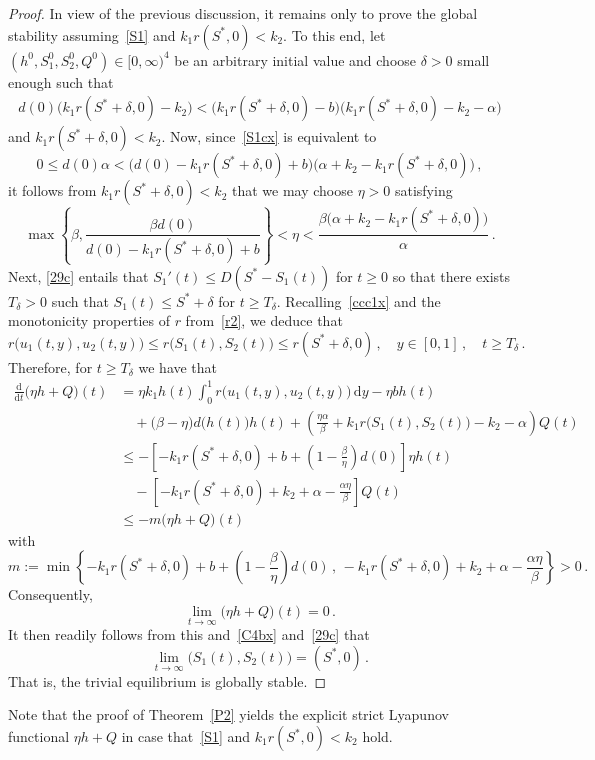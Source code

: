 \documentclass[reqno,11pt]{amsart}
\numberwithin{equation}{section}
\newcommand{\rd}{\mathrm{d}}
\begin{document}
\begin{proof}
In view of the previous discussion, it remains only to prove the global stability assuming~\eqref{S1} and $k_1r(S^*,0)<k_2$. To this end, let~$(h^0, S_1^0,S_2^0, Q^0)\in [0,\infty)^4$ be an arbitrary initial value and choose $\delta>0$ small enough such that  
\begin{align}\label{S1cx}
d(0)\big( k_1r(S^*+\delta,0)-k_2\big)<\big(k_1r(S^*+\delta,0)-b\big)\big(k_1r(S^*+\delta,0)-k_2-\alpha\big) 
\end{align}
and $k_1r(S^*+\delta,0)<k_2$.
Now, since~\eqref{S1cx} is equivalent to
$$
0\le d(0)\alpha< \big(d(0)-k_1r(S^*+\delta,0)+b\big)\big(\alpha+k_2-k_1r(S^*+\delta,0)\big)\,,
$$
it follows from $k_1r(S^*+\delta,0)<k_2$ that we may choose  $\eta>0$ satisfying
$$
\max\left\{\beta,\frac{\beta d(0)}{d(0)-k_1r(S^*+\delta,0)+b}\right\}<\eta<
\frac{\beta \big(\alpha+k_2-k_1r(S^*+\delta,0)\big)}{\alpha}\,.
$$
Next, \eqref{29c} entails that $S_1'(t)\le D(S^*-S_1(t))$ for $t\ge 0$ so that there exists $T_\delta>0$ such that $S_1(t)\le S^*+\delta$ for $t\ge T_\delta$.  Recalling~\eqref{ccc1x} and the monotonicity properties of $r$ from~\eqref{r2}, we deduce that
$$
r\big(u_1(t,y),u_2(t,y)\big)\le r\big(S_1(t),S_2(t)\big)\le r(S^*+\delta,0)\,,\quad y\in [0,1]\,,\quad t\ge T_\delta\,.
$$
Therefore, for $t\ge T_\delta$ we have that
\begin{align*}
\frac{\rd}{\rd t}\big(\eta h+Q\big)(t)&= \eta k_1h(t)\int_0^{1}r\big(u_1(t,y),u_2(t,y)\big)\, \rd y-\eta bh(t)\\
&\quad +\big(\beta-\eta\big) d\big(h(t)\big)h(t)
+\left(\frac{\eta \alpha}{\beta}+k_1r\big(S_1(t),S_2(t)\big)-k_2-\alpha\right)Q(t)\\
&\le -\left[ -k_1r(S^*+\delta,0)+b+\left(1-\frac{\beta}{\eta}\right)d(0)\right] \eta h(t)\\
&\quad -\left[-k_1 r(S^*+\delta,0)+k_2+\alpha-\frac{\alpha\eta}{\beta}\right] Q(t)\\
&\le -m\big(\eta h+Q\big)(t)
\end{align*}
with
$$
m:=\min\left\{ -k_1r(S^*+\delta,0)+b+\left(1-\frac{\beta}{\eta}\right) d(0)\,,\, -k_1 r(S^*+\delta,0)+k_2+\alpha-\frac{\alpha\eta}{\beta}\right\}>0\,.
$$
Consequently,
$$
\lim_{t\to\infty} \big(\eta h+Q\big)(t)=0\,.
$$
It then readily follows from this and~\eqref{C4bx} and~\eqref{29c} that
$$
\lim_{t\to\infty} \big(S_1(t),S_2(t)\big)=(S^*,0)\,.
$$
That is, the trivial equilibrium is globally stable.
\end{proof}


Note that the proof of Theorem~\ref{P2} yields the explicit strict Lyapunov functional $\eta h+Q$ in case that~\eqref{S1}  and  $k_1r(S^*,0)<k_2$ hold.
\end{document}

